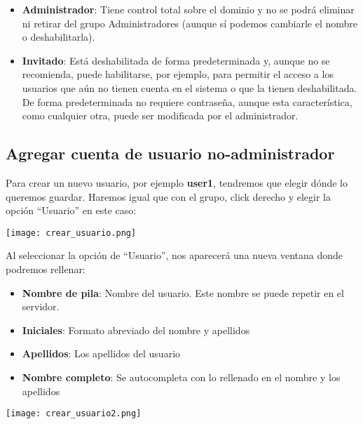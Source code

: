 \begin{itemize}
    \item \textbf{Administrador}: Tiene control total sobre el dominio y no se podrá eliminar ni retirar del grupo Administradores (aunque sí podemos cambiarle el nombre o deshabilitarla).
    \item \textbf{Invitado}: Está deshabilitada de forma predeterminada y, aunque no se recomienda, puede habilitarse, por ejemplo, para permitir el acceso a los usuarios que aún no tienen cuenta en el sistema o que la tienen deshabilitada. De forma predeterminada no requiere contraseña, aunque esta característica, como cualquier otra, puede ser modificada por el administrador.
\end{itemize}

\subsection{Agregar cuenta de usuario no-administrador}
Para crear un nuevo usuario, por ejemplo \textbf{user1}, tendremos que elegir dónde lo queremos guardar. Haremos igual que con el grupo, click derecho y elegir la opción “Usuario” en este caso:

\begin{center}
    \vspace{-10pt}
    \texttt{[image: crear\_usuario.png]}
    \vspace{-10pt}
\end{center}

Al seleccionar la opción de “Usuario”, nos aparecerá una nueva ventana donde podremos rellenar:

{
    \begin{minipage}{0.6\linewidth}
        \begin{itemize}
            \item \textbf{Nombre de pila}: Nombre del usuario. Este nombre se puede repetir en el servidor.
            \item \textbf{Iniciales}: Formato abreviado del nombre y apellidos
            \item \textbf{Apellidos}: Los apellidos del usuario
            \item \textbf{Nombre completo}: Se autocompleta con lo rellenado en el nombre y los apellidos

        \end{itemize}
    \end{minipage}
    \hfill
    \begin{minipage}{0.37\linewidth}
        \texttt{[image: crear\_usuario2.png]}
    \end{minipage}
}

